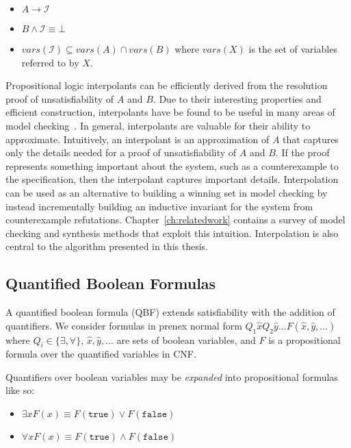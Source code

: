 \begin{itemize}
    \item $A \to \mathcal{I}$
    \item $B \land \mathcal{I} \equiv \bot$
    \item $vars(\mathcal{I}) \subseteq vars(A) \cap vars(B)$ where $vars(X)$ is the set of variables referred to by $X$.
\end{itemize}

Propositional logic interpolants can be efficiently derived from the resolution proof of unsatisfiability of $A$ and $B$. Due to their interesting properties and efficient construction, interpolants have be found to be useful in many areas of model checking~\cite{McMillan05}. In general, interpolants are valuable for their ability to approximate. Intuitively, an interpolant is an approximation of $A$ that captures only the details needed for a proof of unsatisfiability of $A$ and $B$. If the proof represents something important about the system, such as a counterexample to the specification, then the interpolant captures important details.  Interpolation can be used as an alternative to building a winning set in model checking by instead incrementally building an inductive invariant for the system from counterexample refutations. Chapter~\ref{ch:relatedwork} contains a survey of model checking and synthesis methods that exploit this intuition. Interpolation is also central to the algorithm presented in this thesis.

\subsection{Quantified Boolean Formulas}
\label{sec:backgroundQBF}

A quantified boolean formula (QBF) extends satisfiability with the addition of quantifiers. We consider formulas in prenex normal form $Q_1 \hat{x} Q_2 \hat{y} ... F(\hat{x}, \hat{y}, ...)$ where $Q_i \in \{ \exists, \forall \}$, $\hat{x}, \hat{y}, ...$ are sets of boolean variables, and $F$ is a propositional formula over the quantified variables in CNF.

Quantifiers over boolean variables may be \emph{expanded} into propositional formulas like so:

\begin{itemize}
    \item $\exists x F(x) \equiv F(\texttt{true}) \lor F(\texttt{false})$
    \item $\forall x F(x) \equiv F(\texttt{true}) \land F(\texttt{false})$
\end{itemize}

